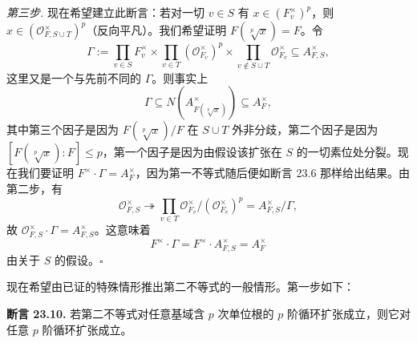 \emph{第三步.} 现在希望建立此断言：若对一切 $v\in S$ 有 $x\in(F_v^\times)^p$，则 $x\in(\mathcal{O}_{F,S\cup T}^\times)^p$（反向平凡）。我们希望证明 $F(\sqrt[p]{x})=F$。令
\[
\Gamma:=\prod_{v\in S}F_v^\times\times\prod_{v\in T}(\mathcal{O}_{F_v}^\times)^p\times\prod_{v\notin S\cup T}\mathcal{O}_{F_v}^\times\subseteq A_{F,S}^\times,
\]
这里又是一个与先前不同的 $\Gamma$。则事实上
\[
\Gamma\subseteq N(A_{F(\sqrt[p]{x})}^\times)\subseteq A_F^\times,
\]
其中第三个因子是因为 $F(\sqrt[p]{x})/F$ 在 $S\cup T$ 外非分歧，第二个因子是因为 $[F(\sqrt[p]{x}):F]\le p$，第一个因子是因为由假设该扩张在 $S$ 的一切素位处分裂。现在我们要证明 $F^\times\cdot\Gamma=A_F^\times$，因为第一不等式随后便如断言 23.6 那样给出结果。由第二步，有
\[
\mathcal{O}_{F,S}^\times\twoheadrightarrow\prod_{v\in T}\mathcal{O}_{F_v}^\times/(\mathcal{O}_{F_v}^\times)^p=A_{F,S}^\times/\Gamma,
\]
故 $\mathcal{O}_{F,S}^\times\cdot\Gamma=A_{F,S}^\times$。这意味着
\[
F^\times\cdot\Gamma=F^\times\cdot A_{F,S}^\times=A_F^\times
\]
由关于 $S$ 的假设。\hfill$\square$

现在希望由已证的特殊情形推出第二不等式的一般情形。第一步如下：

\textbf{断言 23.10.} 若第二不等式对任意基域含 $p$ 次单位根的 $p$ 阶循环扩张成立，则它对任意 $p$ 阶循环扩张成立。

